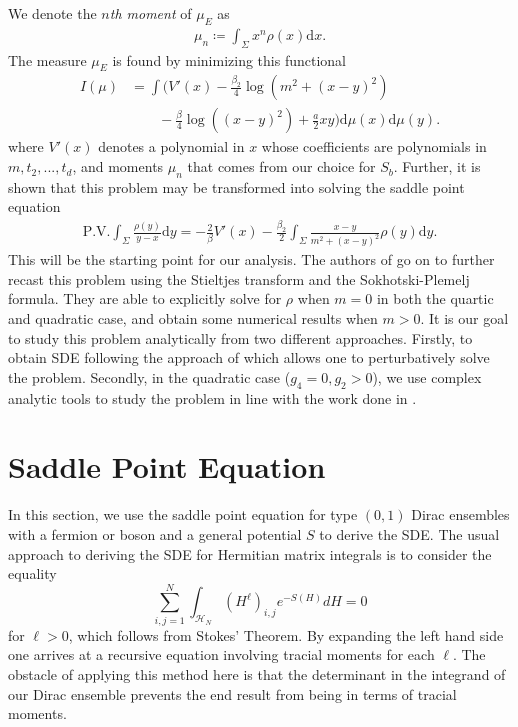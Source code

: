 \documentclass[10pt]{article}
\newcommand{\dif}{\mathrm{d}}
\theoremstyle{plain}
\theoremstyle{definition}
\theoremstyle{plain}
\begin{document}
 We denote the \textit{$n$th moment} of $\mu_E$ as
\begin{align*}
	\mu_n \coloneqq \int_\Sigma x^n\rho(x)\dif x.
\end{align*}
The measure $\mu_E$ is found by minimizing this functional 
\begin{align*}
	I(\mu) &= \int\bigg(V'(x)-\frac{\beta_2}{4}\log(m^2+(x-y)^2)\\&\qquad-\frac{\beta}{4}\log((x-y)^2)+\frac{a}{2}xy\bigg)\dif\mu(x)\dif\mu(y).
\end{align*}
where $V'(x)$ denotes a polynomial in $x$ whose coefficients are polynomials in $m,t_{2},...,t_{d}$, and moments $\mu_{n}$ that comes from our choice for $S_{b}$.
Further, it is shown that this problem may be transformed into solving the saddle point equation
\begin{align*}
	\text{P.V.} \int_\Sigma \frac{\rho(y)}{y-x}\dif y = -\frac{2}{\beta}V'(x)-\frac{\beta_2}{2}\int_\Sigma \frac{x-y}{m^2+(x-y)^2}\rho(y)\dif y.
\end{align*}
This will be the starting point for our analysis. The authors of \cite{khalkhali2024large} go on to further recast this problem using the Stieltjes transform and the Sokhotski-Plemelj formula. They are able to explicitly solve for $\rho$ when $m=0$ in both the quartic and quadratic case, and obtain some numerical results when $m>0$. It is our goal to study this problem analytically from two different approaches. Firstly, to obtain SDE following the approach of \cite{eynard1998iterative} which allows one to perturbatively solve the problem. Secondly, in the quadratic case ($g_4 = 0, g_2>0$), we use complex analytic tools to study the problem in line with the work done in \cite{hoppe1989quantum,kazakov1999d,kostov2002exact}. 











\section{Saddle Point Equation}\label{sec: DSE from saddle}
In this section, we use the saddle point equation for type $(0,1)$ Dirac ensembles with a fermion or boson and a general potential $S$ to derive the SDE. The usual approach to deriving the SDE for Hermitian matrix integrals is to consider the equality 
\begin{equation*}
    \sum_{i,j=1}^{N}\int_{\mathcal{H}_{N}} (H^{\ell})_{i,j} e^{-S(H)}dH = 0 
\end{equation*}
for $\ell>0$, which follows from Stokes' Theorem. By expanding the left hand side one arrives at a recursive equation involving tracial moments for each $\ell$. The obstacle of applying this method here is that the determinant in the integrand of our Dirac ensemble prevents the end result from being in terms of tracial moments.  
\end{document}
